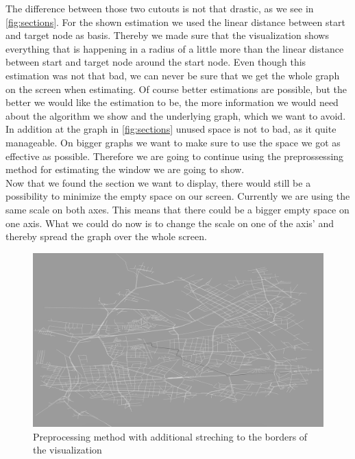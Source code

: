 \documentclass
[
	paper = a4,
    pagesize,
	12 pt,
	oneside,                       %
    open = right,
	DIV = calc,
	BCOR = 0 mm,                   %
	bibtotoc
]
{scrbook}
\begin{document}
The difference between those two cutouts is not that drastic, as we see in \cref{fig:sections}.
For the shown estimation we used the linear distance between start and target node as basis.
Thereby we made sure that the visualization shows everything that is happening in a radius of a little more than the linear distance between start and target node around the start node.
Even though this estimation was not that bad, we can never be sure that we get the whole graph on the screen when estimating.
Of course better estimations are possible, but the better we would like the estimation to be, the more information we would need about the algorithm we show and the underlying graph, which we want to avoid.
In addition at the graph in \cref{fig:sections} unused space is not to bad, as it quite manageable.
On bigger graphs we want to make sure to use the space we got as effective as possible.
Therefore we are going to continue using the preprossessing method for estimating the window we are going to show.\\

Now that we found the section we want to display, there would still be a possibility to minimize the empty space on our screen.
Currently we are using the same scale on both axes.
This means that there could be a bigger empty space on one axis.
What we could do now is to change the scale on one of the axis' and thereby spread the graph over the whole screen.

\begin{figure}[H]
	\includegraphics[width=\textwidth]{Images/vis-preprocessing-streched.png}
\caption[]{Preprocessing method with additional streching to the borders of the visualization}
\label{fig:spreaded_axis}
\end{figure}
\end{document}
